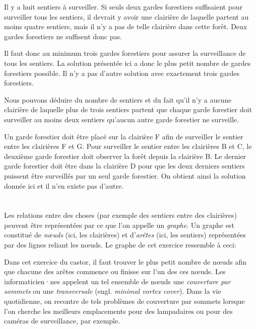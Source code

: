 {{Il y a huit sentiers à surveiller. Si seuls deux gardes forestiers suffisaient pour surveiller tous les sentiers, il devrait y avoir une clairière de laquelle partent au moins quatre sentiers, mais il n’y a pas de telle clairière dans cette forêt. Deux gardes forestiers ne suffisent donc pas.

Il faut donc au minimum trois gardes forestiers pour assurer la surveillance de tous les sentiers. La solution présentée ici a donc le plus petit nombre de gardes forestiers possible. Il n’y a pas d’autre solution avec exactement trois gardes forestiers.

Nous pouvons déduire du nombre de sentiers et du fait qu’il n’y a aucune clairière de laquelle plus de trois sentiers partent que chaque garde forestier doit surveiller au moins deux sentiers qu’aucun autre garde forestier ne surveille.

Un garde forestier doit être placé sur la clairière F afin de surveiller le sentier entre les clairières F et G. Pour surveiller le sentier entre les clairières B et C, le deuxième garde forestier doit observer la forêt depuis la clairière B. Le dernier garde forestier doit être dans la clairière D pour que les deux derniers sentiers puissent être surveillés par un seul garde forestier. On obtient ainsi la solution donnée ici et il n’en existe pas d’autre.



\section*{\BrochureItsInformatics}
Les relations entre des choses (par exemple des sentiers entre des clairières) peuvent être représentées par ce que l’on appelle un \emph{graphe}. Un graphe est constitué de \emph{nœuds} (ici, les clairières) et d’\emph{arêtes} (ici, les sentiers) représentées par des lignes reliant les nœuds. Le graphe de cet exercice ressemble à ceci:

{\centering%
\par}

Dans cet exercice du castor, il faut trouver le plus petit nombre de nœuds afin que chacune des arêtes commence ou finisse sur l’un des ces nœuds. Les informaticien·nes appelent un tel ensemble de nœuds une \emph{couverture par sommets} ou une \emph{transversale} (engl. \emph{minimal vortex cover}). Dans la vie quotidienne, on recontre de tels problèmes de couverture par sommets lorsque l’on cherche les meilleurs emplacements pour des lampadaires ou pour des caméras de surveillance, par exemple.



}}
